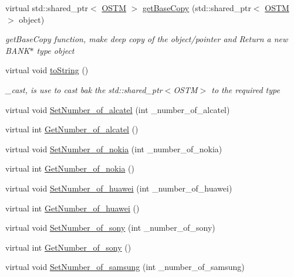 \begin{DoxyCompactItemize}
virtual std\+::shared\+\_\+ptr$<$ \hyperlink{class_o_s_t_m}{O\+S\+TM} $>$ \hyperlink{class_s_l_i_g_o___w_a37ead49afd27bfe7e404d1d7626f09fe}{get\+Base\+Copy} (std\+::shared\+\_\+ptr$<$ \hyperlink{class_o_s_t_m}{O\+S\+TM} $>$ object)
\begin{DoxyCompactList}\small\item\em get\+Base\+Copy function, make deep copy of the object/pointer and Return a new B\+A\+N\+K$\ast$ type object \end{DoxyCompactList}\item 
virtual void \hyperlink{class_s_l_i_g_o___w_a8f49deaa85f48ff29dd8cdeb7c9dda56}{to\+String} ()
\begin{DoxyCompactList}\small\item\em \+\_\+cast, is use to cast bak the std\+::shared\+\_\+ptr$<$\+O\+S\+T\+M$>$ to the required type \end{DoxyCompactList}\item 
virtual void \hyperlink{class_s_l_i_g_o___w_abbd14fe78b2f5881020630842194aa5b}{Set\+Number\+\_\+of\+\_\+alcatel} (int \+\_\+number\+\_\+of\+\_\+alcatel)
\item 
virtual int \hyperlink{class_s_l_i_g_o___w_a5afed1018d0629a1e08fc266d05a94d9}{Get\+Number\+\_\+of\+\_\+alcatel} ()
\item 
virtual void \hyperlink{class_s_l_i_g_o___w_a2b748e4d815e0f2bdb8fb1b0e85b2636}{Set\+Number\+\_\+of\+\_\+nokia} (int \+\_\+number\+\_\+of\+\_\+nokia)
\item 
virtual int \hyperlink{class_s_l_i_g_o___w_a1aa9c9f001b37f3fdcdffae009319298}{Get\+Number\+\_\+of\+\_\+nokia} ()
\item 
virtual void \hyperlink{class_s_l_i_g_o___w_a3f770536e7ae43cba203b36b452bca76}{Set\+Number\+\_\+of\+\_\+huawei} (int \+\_\+number\+\_\+of\+\_\+huawei)
\item 
virtual int \hyperlink{class_s_l_i_g_o___w_a5804f623f4eb290df4f6b3aba59230d6}{Get\+Number\+\_\+of\+\_\+huawei} ()
\item 
virtual void \hyperlink{class_s_l_i_g_o___w_abbfe7001333b8c0b57a22f09ec4c3c1d}{Set\+Number\+\_\+of\+\_\+sony} (int \+\_\+number\+\_\+of\+\_\+sony)
\item 
virtual int \hyperlink{class_s_l_i_g_o___w_a62822c4fb80f739bee61767238a29e14}{Get\+Number\+\_\+of\+\_\+sony} ()
\item 
virtual void \hyperlink{class_s_l_i_g_o___w_ace5a2d4fae4c84710a648062e60022d2}{Set\+Number\+\_\+of\+\_\+samsung} (int \+\_\+number\+\_\+of\+\_\+samsung)
\item 

\end{DoxyCompactItemize}
